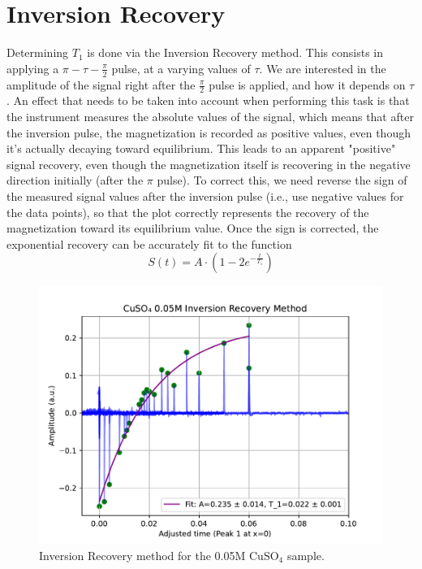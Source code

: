\documentclass[12pt]{article}
\begin{document}


\section{Inversion Recovery}
Determining $T_1$ is done via the Inversion Recovery method. This consists in applying a $\pi-\tau-\frac{\pi}{2}$ pulse, at a varying values of $\tau$. We are interested in the amplitude of the signal right after the $\frac{\pi}{2}$ pulse is applied, and how it depends on $\tau$. An effect that needs to be taken into account when performing this task is that the instrument measures the absolute values of the signal, which means that after the inversion pulse, the magnetization is recorded as positive values, even though it’s actually decaying toward equilibrium. This leads to an apparent "positive" signal recovery, even though the magnetization itself is recovering in the negative direction initially (after the $\pi$ pulse). To correct this, we need reverse the sign of the measured signal values after the inversion pulse (i.e., use negative values for the data points), so that the plot correctly represents the recovery of the magnetization toward its equilibrium value. Once the sign is corrected, the exponential recovery can be accurately fit to the function  \[
	S(t) = A \cdot \left( 1 - 2e^{-\frac{t}{T_1}} \right)
\]
\begin{figure}[H]
  \includegraphics[scale = 0.6]{IR_0.05.pdf}
  \caption{Inversion Recovery method for the 0.05M $\text{CuSO}_4$ sample.}
  \label{IR_0.05.pdf}
\end{figure}
\end{document}
